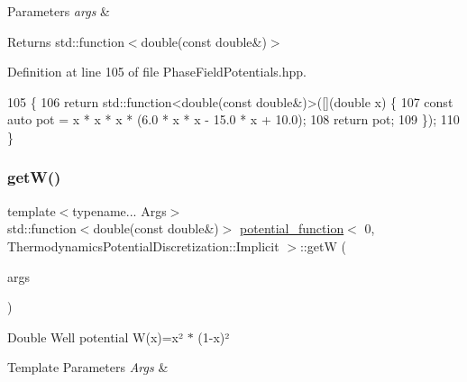 \begin{DoxyParams}{Parameters}
{\em args} & \\
\hline
\end{DoxyParams}
\begin{DoxyReturn}{Returns}
std\+::function$<$double(const double\&)$>$ 
\end{DoxyReturn}


Definition at line 105 of file Phase\+Field\+Potentials.\+hpp.


\begin{DoxyCode}
105                                                         \{
106     \textcolor{keywordflow}{return} std::function<double(const double&)>([](\textcolor{keywordtype}{double} x) \{
107       \textcolor{keyword}{const} \textcolor{keyword}{auto} pot = x * x * x * (6.0 * x * x - 15.0 * x + 10.0);
108       \textcolor{keywordflow}{return} pot;
109     \});
110   \}
\end{DoxyCode}
\mbox{\label{structpotential__function_3_010_00_01ThermodynamicsPotentialDiscretization_1_1Implicit_01_4_ac15781824e0ce378683ca91749cd6eb8}} 
\subsubsection{\texorpdfstring{get\+W()}{getW()}}
{\footnotesize\ttfamily template$<$typename... Args$>$ \\
std\+::function$<$double(const double\&)$>$ \hyperlink{structpotential__function}{potential\+\_\+function}$<$ 0, Thermodynamics\+Potential\+Discretization\+::\+Implicit $>$\+::getW (\begin{DoxyParamCaption}\item[{Args...}]{args }\end{DoxyParamCaption})\hspace{0.3cm}{\ttfamily [inline]}}



Double Well potential W(x)=x² $\ast$ (1-\/x)² 


\begin{DoxyTemplParams}{Template Parameters}
{\em Args} & \\
\hline
\end{DoxyTemplParams}

